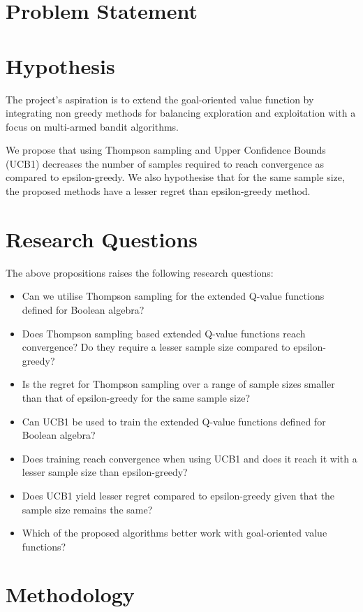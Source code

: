 \documentclass[a4paper,twoside,12pt]{report}
\begin{document}
\section{Problem Statement}

\section{Hypothesis}
The project's aspiration is to extend the goal-oriented value function by integrating non greedy methods for balancing 
exploration and exploitation with a focus on multi-armed bandit algorithms.

We propose that using Thompson sampling and Upper Confidence Bounds (UCB1) decreases the number of samples required to reach 
convergence as compared to epsilon-greedy. We also hypothesise that for the same sample size, the proposed methods have 
a lesser regret than epsilon-greedy method.

\section{Research Questions}
The above propositions raises the following research questions:

\begin{itemize}
  \item Can we utilise Thompson sampling for the extended Q-value functions defined for Boolean algebra?
  \item Does Thompson sampling based extended Q-value functions reach convergence? Do they require a lesser sample size 
  compared to epsilon-greedy?
  \item Is the regret for Thompson sampling over a range of sample sizes smaller than that of epsilon-greedy for the same
  sample size?
  \item Can UCB1 be used to train the extended Q-value functions defined for Boolean algebra?
  \item Does training reach convergence when using UCB1 and does it reach it with a lesser sample size than epsilon-greedy?
  \item Does UCB1 yield lesser regret compared to epsilon-greedy given that the sample size remains the same?
  \item Which of the proposed algorithms better work with goal-oriented value functions?
\end{itemize}

\section{Methodology}
\end{document}
